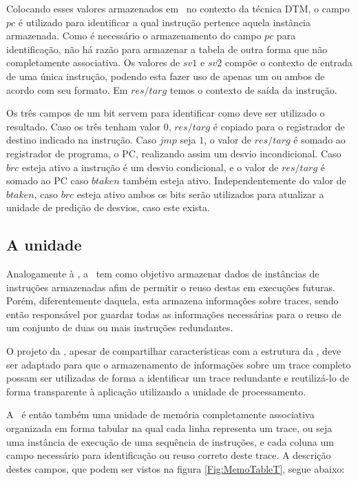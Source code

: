 Colocando esses valores armazenados em \tableg\ no contexto da técnica DTM, o campo $pc$ é utilizado para identificar a qual instrução pertence aquela instância armazenada. Como é necessário o armazenamento do campo $pc$ para identificação, não há razão para armazenar a tabela de outra forma que não completamente associativa. Os valores de $sv1$ e $sv2$ compõe o contexto de entrada de uma única instrução, podendo esta fazer uso de apenas um ou ambos de acordo com seu formato. Em $res/targ$ temos o contexto de saída da instrução.

Os três campos de um bit servem para identificar como deve ser utilizado o resultado. Caso os três tenham valor $0$, $res/targ$ é copiado para o registrador de destino indicado na instrução. Caso $jmp$ seja $1$, o valor de $res/targ$ é somado ao registrador de programa, o PC, realizando assim um desvio incondicional. Caso $brc$ esteja ativo a instrução é um desvio condicional, e o valor de $res/targ$ é somado ao PC caso $btaken$ também esteja ativo. Independentemente do valor de $btaken$, caso $brc$ esteja ativo ambos os bits serão utilizados para atualizar a unidade de predição de desvios, caso este exista.

\subsection{A unidade \tablet}
\label{Fundamentacao:DTMHardware:TableT}

Analogamente à \tableg, a \tablet\ tem como objetivo armazenar dados de instâncias de instruções armazenadas afim de permitir o reuso destas em execuções futuras. Porém, diferentemente daquela, esta armazena informações sobre traces, sendo então responsável por guardar todas as informações necessárias para o reuso de um conjunto de duas ou mais instruções redundantes.

O projeto da \tablet, apesar de compartilhar características com a estrutura da \tableg, deve ser adaptado para que o armazenamento de informações sobre um trace completo possam ser utilizadas de forma a identificar um trace redundante e reutilizá-lo de forma transparente à aplicação utilizando a unidade de processamento. 

A \tablet\ é então também uma unidade de memória completamente associativa organizada em forma tabular na qual cada linha representa um trace, ou seja uma instância de execução de uma sequência de instruções, e cada coluna um campo necessário para identificação ou reuso correto deste trace. A descrição destes campos, que podem ser vistos na figura \ref{Fig:MemoTableT}, segue abaixo:

